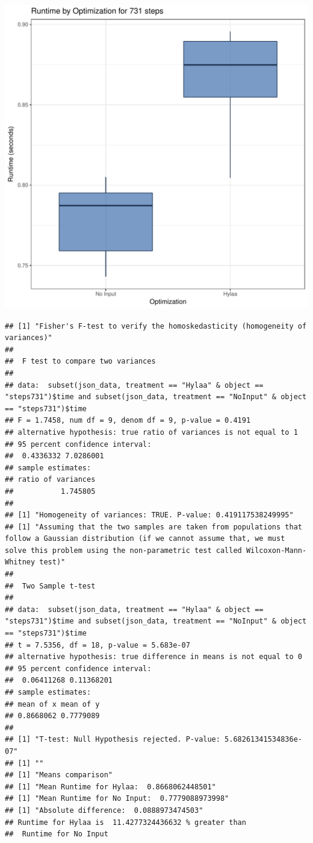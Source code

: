 \documentclass{article}\usepackage[]{graphicx}\usepackage[]{color}
\makeatletter
\def\maxwidth{ %
  \ifdim\Gin@nat@width>\linewidth
    \linewidth
  \else
    \Gin@nat@width
  \fi
}
\newenvironment{kframe}{%
 \def\at@end@of@kframe{}%
 \ifinner\ifhmode%
  \def\at@end@of@kframe{\end{minipage}}%
  \begin{minipage}{\columnwidth}%
 \fi\fi%
 \def\FrameCommand##1{\hskip\@totalleftmargin \hskip-\fboxsep
 \colorbox{shadecolor}{##1}\hskip-\fboxsep
     \hskip-\linewidth \hskip-\@totalleftmargin \hskip\columnwidth}%
 \MakeFramed {\advance\hsize-\width
   \@totalleftmargin\z@ \linewidth\hsize
   \@setminipage}}%
 {\par\unskip\endMakeFramed%
 \at@end@of@kframe}
\newenvironment{knitrout}{}{} %
\makeatother
\begin{document}
\begin{knitrout}
\color{fgcolor}
\includegraphics[width=\maxwidth]{figure/RH4_steps731-1} 
\begin{kframe}\begin{verbatim}
## [1] "Fisher's F-test to verify the homoskedasticity (homogeneity of variances)"
## 
## 	F test to compare two variances
## 
## data:  subset(json_data, treatment == "Hylaa" & object == "steps731")$time and subset(json_data, treatment == "NoInput" & object == "steps731")$time
## F = 1.7458, num df = 9, denom df = 9, p-value = 0.4191
## alternative hypothesis: true ratio of variances is not equal to 1
## 95 percent confidence interval:
##  0.4336332 7.0286001
## sample estimates:
## ratio of variances 
##           1.745805 
## 
## [1] "Homogeneity of variances: TRUE. P-value: 0.419117538249995"
## [1] "Assuming that the two samples are taken from populations that follow a Gaussian distribution (if we cannot assume that, we must solve this problem using the non-parametric test called Wilcoxon-Mann-Whitney test)"
## 
## 	Two Sample t-test
## 
## data:  subset(json_data, treatment == "Hylaa" & object == "steps731")$time and subset(json_data, treatment == "NoInput" & object == "steps731")$time
## t = 7.5356, df = 18, p-value = 5.683e-07
## alternative hypothesis: true difference in means is not equal to 0
## 95 percent confidence interval:
##  0.06411268 0.11368201
## sample estimates:
## mean of x mean of y 
## 0.8668062 0.7779089 
## 
## [1] "T-test: Null Hypothesis rejected. P-value: 5.68261341534836e-07"
## [1] ""
## [1] "Means comparison"
## [1] "Mean Runtime for Hylaa:  0.8668062448501"
## [1] "Mean Runtime for No Input:  0.7779088973998"
## [1] "Absolute difference:  0.0888973474503"
## Runtime for Hylaa is  11.4277324436632 % greater than 
##  Runtime for No Input
\end{verbatim}
\end{kframe}
\end{knitrout}
\end{document}
